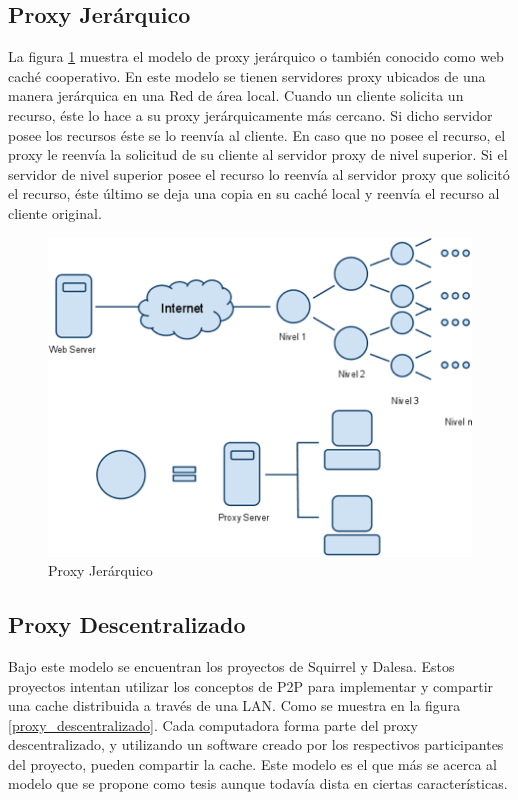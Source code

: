 
\subsection{Proxy Jerárquico}

La figura \ref{proxy_jerarquico} muestra el modelo de proxy jerárquico o también conocido como web caché cooperativo. En este modelo se tienen servidores proxy ubicados de una manera jerárquica en una Red de área local. Cuando un cliente solicita un recurso, éste lo hace a su proxy jerárquicamente más cercano. Si dicho servidor posee los recursos éste se lo reenvía al cliente. En caso que no posee el recurso, el proxy le reenvía la solicitud de su cliente al servidor proxy de nivel superior. Si el servidor de nivel superior posee el recurso lo reenvía al servidor proxy que solicitó el recurso, éste último se deja una copia en su caché local y reenvía el recurso al cliente original.

\begin{figure}[h]
  \centering
    \includegraphics[scale=0.75]{gfx/proxy_jerarquico}
  \caption{Proxy Jerárquico}
  \label{proxy_jerarquico}
\end{figure}


\subsection{Proxy Descentralizado}

Bajo este modelo se encuentran los proyectos de Squirrel y Dalesa. Estos proyectos intentan utilizar los conceptos de P2P para implementar y compartir una cache distribuida a través de una LAN. Como se muestra en la figura \ref{proxy_descentralizado}. Cada computadora forma parte del proxy descentralizado, y utilizando un software creado por los respectivos participantes del proyecto, pueden compartir la cache. Este modelo es el que más se acerca al modelo que se propone como tesis aunque todavía dista en ciertas características.

